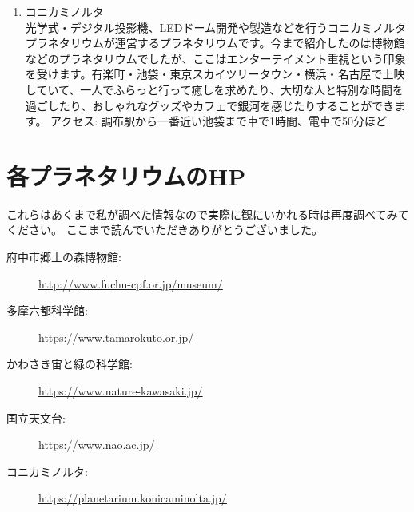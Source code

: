 \documentclass[supernova_2023]{subfiles}
\begin{document}
\begin{enumerate}
  \vspace{\zw}
  \item {}
  コニカミノルタ\mbox{}\\光学式・デジタル投影機、LEDドーム開発や製造などを行うコニカミノルタプラネタリウムが運営するプラネタリウムです。今まで紹介したのは博物館などのプラネタリウムでしたが、ここはエンターテイメント重視という印象を受けます。有楽町・池袋・東京スカイツリータウン・横浜・名古屋で上映していて、一人でふらっと行って癒しを求めたり、大切な人と特別な時間を過ごしたり、おしゃれなグッズやカフェで銀河を感じたりすることができます。
  \vspace{-\zw}アクセス: 調布駅から一番近い池袋まで車で1時間、電車で50分ほど
\end{enumerate}

{}
\section*{各プラネタリウムのHP}
これらはあくまで私が調べた情報なので実際に観にいかれる時は再度調べてみてください。
ここまで読んでいただきありがとうございました。

\begin{description}
  \item[府中市郷土の森博物館: ] \url{http://www.fuchu-cpf.or.jp/museum/}
  \item[多摩六都科学館: ] \url{https://www.tamarokuto.or.jp/}
  \item[かわさき宙と緑の科学館: ] \url{ https://www.nature-kawasaki.jp/}
  \item[国立天文台: ] \url{https://www.nao.ac.jp/}
  \item[コニカミノルタ: ] \url{https://planetarium.konicaminolta.jp/}
\end{description}
\end{document}
